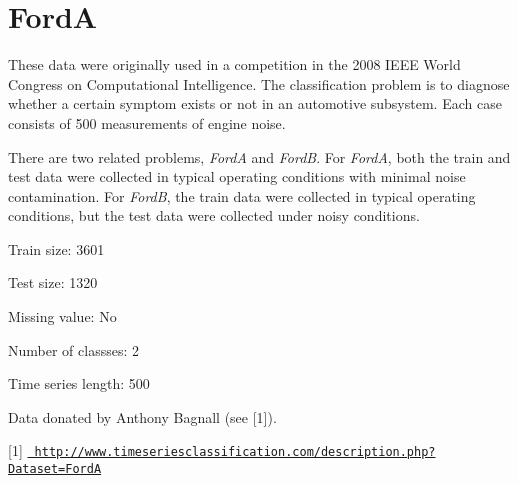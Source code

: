 \chapter{FordA}
\hypertarget{md_external_2data_2UCRArchive__2018_2FordA_2README}{}\label{md_external_2data_2UCRArchive__2018_2FordA_2README}
\label{md_external_2data_2UCRArchive__2018_2FordA_2README_autotoc_md74}%
%
 These data were originally used in a competition in the 2008 IEEE World Congress on Computational Intelligence. The classification problem is to diagnose whether a certain symptom exists or not in an automotive subsystem. Each case consists of 500 measurements of engine noise.

There are two related problems, {\itshape FordA} and {\itshape FordB}. For {\itshape FordA}, both the train and test data were collected in typical operating conditions with minimal noise contamination. For {\itshape FordB}, the train data were collected in typical operating conditions, but the test data were collected under noisy conditions.

Train size\+: 3601

Test size\+: 1320

Missing value\+: No

Number of classses\+: 2

Time series length\+: 500

Data donated by Anthony Bagnall (see \mbox{[}1\mbox{]}).

\mbox{[}1\mbox{]} \href{http://www.timeseriesclassification.com/description.php?Dataset=FordA}{\texttt{ http\+://www.\+timeseriesclassification.\+com/description.\+php?\+Dataset=\+FordA}} 